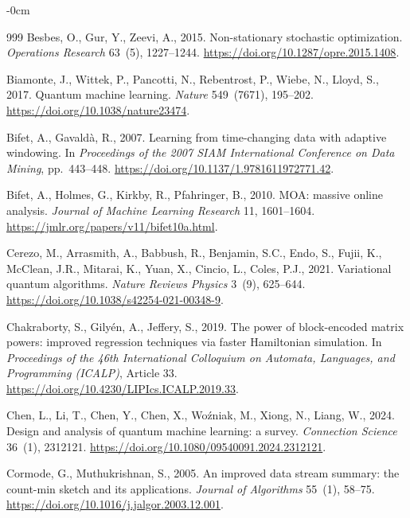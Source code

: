\documentclass[sensors,article,submit,pdftex,moreauthors]{Definitions/mdpi}
\begin{document}
\begin{adjustwidth}{-\extralength}{0cm}
\begin{thebibliography}{999}
Besbes, O., Gur, Y., Zeevi, A., 2015.
\newblock Non-stationary stochastic optimization.
\newblock \emph{Operations Research} 63~(5), 1227--1244.
\newblock \url{https://doi.org/10.1287/opre.2015.1408}.

Biamonte, J., Wittek, P., Pancotti, N., Rebentrost, P., Wiebe, N., Lloyd, S., 2017.
\newblock Quantum machine learning.
\newblock \emph{Nature} 549~(7671), 195--202.
\newblock \url{https://doi.org/10.1038/nature23474}.

Bifet, A., Gavald\`a, R., 2007.
\newblock Learning from time-changing data with adaptive windowing.
\newblock In \emph{Proceedings of the 2007 SIAM International Conference on Data Mining}, pp.~443--448.
\newblock \url{https://doi.org/10.1137/1.9781611972771.42}.

Bifet, A., Holmes, G., Kirkby, R., Pfahringer, B., 2010.
\newblock MOA: massive online analysis.
\newblock \emph{Journal of Machine Learning Research} 11, 1601--1604.
\newblock \url{https://jmlr.org/papers/v11/bifet10a.html}.

Cerezo, M., Arrasmith, A., Babbush, R., Benjamin, S.C., Endo, S., Fujii, K., McClean, J.R., Mitarai, K., Yuan, X., Cincio, L., Coles, P.J., 2021.
\newblock Variational quantum algorithms.
\newblock \emph{Nature Reviews Physics} 3~(9), 625--644.
\newblock \url{https://doi.org/10.1038/s42254-021-00348-9}.

Chakraborty, S., Gily\'en, A., Jeffery, S., 2019.
\newblock The power of block-encoded matrix powers: improved regression techniques via faster Hamiltonian simulation.
\newblock In \emph{Proceedings of the 46th International Colloquium on Automata, Languages, and Programming (ICALP)}, Article 33.
\newblock \url{https://doi.org/10.4230/LIPIcs.ICALP.2019.33}.

Chen, L., Li, T., Chen, Y., Chen, X., Wo\'zniak, M., Xiong, N., Liang, W., 2024.
\newblock Design and analysis of quantum machine learning: a survey.
\newblock \emph{Connection Science} 36~(1), 2312121.
\newblock \url{https://doi.org/10.1080/09540091.2024.2312121}.

Cormode, G., Muthukrishnan, S., 2005.
\newblock An improved data stream summary: the count-min sketch and its applications.
\newblock \emph{Journal of Algorithms} 55~(1), 58--75.
\newblock \url{https://doi.org/10.1016/j.jalgor.2003.12.001}.


\end{thebibliography}
\end{adjustwidth}
\end{document}
